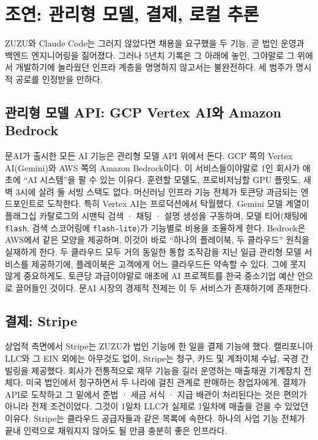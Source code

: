 \documentclass{article}
\begin{document}
\section{조연: 관리형 모델, 결제, 로컬 추론}

ZUZU와 Claude Code는 그러지 않았다면 채용을 요구했을 두 기능, 곧 법인 운영과 백엔드 엔지니어링을 짊어졌다. 그러나 5년치 기록은 그 아래에 놓인, 그야말로 그 위에서 개발하기에 놀라웠던 인프라 계층을 명명하지 않고서는 불완전하다. 세 범주가 명시적 공로를 인정받을 만하다.

\subsection{관리형 모델 API: GCP Vertex AI와 Amazon Bedrock}

문AI가 출시한 모든 AI 기능은 관리형 모델 API 위에서 돈다. GCP 쪽의 Vertex AI(Gemini)와 AWS 쪽의 Amazon Bedrock이다. 이 서비스들이야말로 1인 회사가 애초에 ``AI 시스템''을 팔 수 있는 이유다. 훈련할 모델도, 프로비저닝할 GPU 플릿도, 새벽 3시에 살려 둘 서빙 스택도 없다. 머신러닝 인프라 기능 전체가 토큰당 과금되는 엔드포인트로 도착한다. 특히 Vertex AI는 프로덕션에서 탁월했다. Gemini 모델 계열이 플래그십 카탈로그의 시맨틱 검색 · 채팅 · 설명 생성을 구동하며, 모델 티어(채팅에 \texttt{flash}, 검색 스코어링에 \texttt{flash-lite})가 기능별로 비용을 조율하게 한다. Bedrock은 AWS에서 같은 모양을 제공하며, 이것이 바로 ``하나의 플레이북, 두 클라우드'' 원칙을 실재하게 한다. 두 클라우드 모두 거의 동일한 통합 조작감을 지닌 일급 관리형 모델 서비스를 제공하기에, 플레이북은 고객에게 어느 클라우드든 약속할 수 있다. 그에 못지않게 중요하게도, 토큰당 과금이야말로 애초에 AI 프로젝트를 한국 중소기업 예산 안으로 끌어들인 것이다. 문AI 시장의 경제적 전제는 이 두 서비스가 존재하기에 존재한다.

\subsection{결제: Stripe}

상업적 측면에서 Stripe는 ZUZU가 법인 기능에 한 일을 결제 기능에 했다. 캘리포니아 LLC와 그 EIN 외에는 아무것도 없이, Stripe는 청구, 카드 및 계좌이체 수납, 국경 간 빌링을 제공했다. 회사가 전통적으로 재무 기능을 길러 운영하는 매출채권 기계장치 전체다. 미국 법인에서 청구하면서 두 나라에 걸친 관계로 판매하는 창업자에게, 결제가 API로 도착하고 그 밑에서 준법 · 세금 서식 · 지급 배관이 처리된다는 것은 편의가 아니라 전제 조건이었다. 그것이 1일차 LLC가 실제로 1일차에 매출을 걷을 수 있었던 이유다. Stripe는 클라우드 공급자들과 같은 목록에 속한다. 하나의 사업 기능 전체가 끝내 인력으로 채워지지 않아도 될 만큼 충분히 좋은 인프라다.
\end{document}
